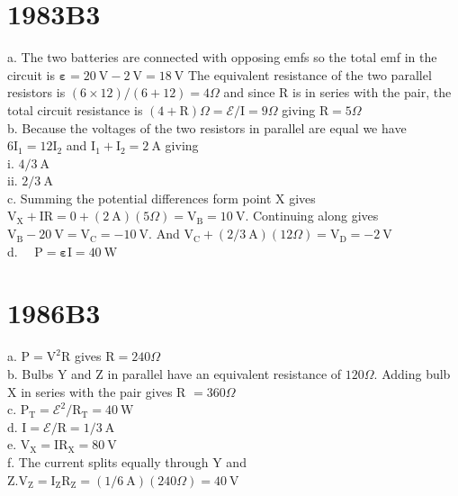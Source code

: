 \begin{enumerate}
\section*{1983B3}
a. The two batteries are connected with opposing emfs so the total emf in the circuit is $\boldsymbol{\varepsilon}=20 \mathrm{~V}-2 \mathrm{~V}=18 \mathrm{~V}$ The equivalent resistance of the two parallel resistors is $(6 \times 12) /(6+12)=4 \Omega$ and since R is in series with the pair, the total circuit resistance is $(4+\mathrm{R}) \Omega=\mathcal{E} / \mathrm{I}=9 \Omega$ giving $\mathrm{R}=5 \Omega$\\
b. Because the voltages of the two resistors in parallel are equal we have $6 \mathrm{I}_{1}=12 \mathrm{I}_{2}$ and $\mathrm{I}_{1}+\mathrm{I}_{2}=2 \mathrm{~A}$ giving\\
i. $4 / 3 \mathrm{~A}$\\
ii. $2 / 3 \mathrm{~A}$\\
c. Summing the potential differences form point X gives $\mathrm{V}_{\mathrm{X}}+\mathrm{IR}=0+(2 \mathrm{~A})(5 \Omega)=\mathrm{V}_{\mathrm{B}}=10 \mathrm{~V}$. Continuing along gives $\mathrm{V}_{\mathrm{B}}-20 \mathrm{~V}=\mathrm{V}_{\mathrm{C}}=-10 \mathrm{~V}$. And $\mathrm{V}_{\mathrm{C}}+(2 / 3 \mathrm{~A})(12 \Omega)=\mathrm{V}_{\mathrm{D}}=-2 \mathrm{~V}$\\
d. $\quad \mathrm{P}=\boldsymbol{\varepsilon} \mathrm{I}=40 \mathrm{~W}$

\section*{1986B3}
a. $\mathrm{P}=\mathrm{V}^{2} \mathrm{R}$ gives $\mathrm{R}=240 \Omega$\\
b. Bulbs Y and Z in parallel have an equivalent resistance of $120 \Omega$. Adding bulb X in series with the pair gives R $=360 \Omega$\\
c. $\mathrm{P}_{\mathrm{T}}=\boldsymbol{\mathcal { E }}^{2} / \mathrm{R}_{\mathrm{T}}=40 \mathrm{~W}$\\
d. $\mathrm{I}=\boldsymbol{\mathcal { E }} / \mathrm{R}=1 / 3 \mathrm{~A}$\\
e. $\mathrm{V}_{\mathrm{X}}=\mathrm{IR}_{\mathrm{X}}=80 \mathrm{~V}$\\
f. The current splits equally through Y and $\mathrm{Z} . \mathrm{V}_{\mathrm{Z}}=\mathrm{I}_{\mathrm{Z}} \mathrm{R}_{\mathrm{Z}}=(1 / 6 \mathrm{~A})(240 \Omega)=40 \mathrm{~V}$


\end{enumerate}
